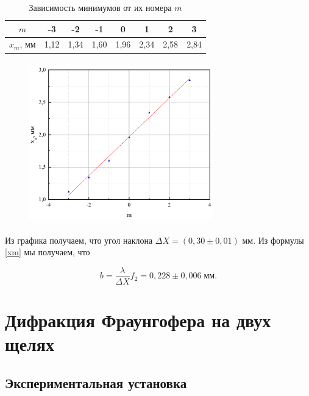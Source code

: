 \documentclass[a4paper,12pt]{article} %
\begin{document}
\begin{table}[h!]
	\caption{Зависимость минимумов от их номера $ m $}
	\begin{center}
		\begin{tabular}{|c|c|c|c|c|c|c|c|} \hline
			$m$&-3&-2&-1&0&1&2&3 \\ \hline
			$ x_m $, мм  & 1,12&1,34&1,60&1,96&2,34&2,58&2,84 \\ \hline
		\end{tabular}
	\end{center}
	\label{}
\end{table}

\begin{figure}[h!]
	\begin{floatrow}
		{\includegraphics[width=8cm,height=7cm]{graph2}}         
	\end{floatrow}
\end{figure}



Из графика получаем, что угол наклона $ \Delta X = (0,30 \pm 0,01)  $ мм. Из формулы \eqref{xm} мы получаем, что 

\begin{equation}\label{qqq}
b =  \dfrac{\lambda}{\Delta X} f_2 = 0,228 \pm 0,006 \; мм. 
\end{equation}

\section{Дифракция Фраунгофера на двух щелях}

\subsection{Экспериментальная установка}
\end{document}
